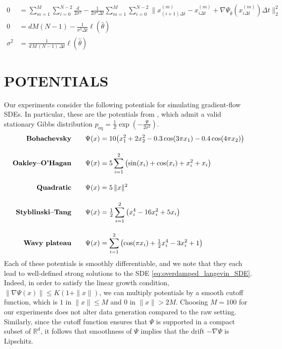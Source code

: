 \documentclass[twoside]{article}
\newcommand{\R} {\mathbb R}
\begin{document}
\begin{align*}
    0 &= \sum_{m=1}^{M}\sum_{i=0}^{N-2}\frac{d}{2\sigma^2} - \frac{1}{2\sigma^4 \Delta t}\sum_{m=1}^{M}\sum_{i=0}^{N-2}\Big\|x_{(i+1)\Delta t}^{(m)}-x_{i\Delta t}^{(m)}+\nabla \Psi_{\hat{\theta}}(x_{i\Delta t}^{(m)})\Delta t\Big\|_2^2 \\
    0 &= dM(N-1)- \frac{1}{ \sigma^2\Delta t} \ell(\hat{\theta})\\
    \sigma^2 &= \frac{1}{d\,M\,(N-1)\,\Delta t}\ell(\hat{\theta})
\end{align*}







\section{POTENTIALS}
\label{sec:potentials}

Our experiments consider the following potentials for simulating gradient-flow SDEs. In particular, these are the potentials from \citet{terpin2024learning}, which admit a valid stationary Gibbs distribution $p_{\mathrm{eq}}=\frac{1}{Z}\exp\left(-\frac{\Psi}{2\sigma^2} \right)$.
\begin{align}
\text{\textbf{Bohachevsky}} \qquad
\Psi(x) &= 10\!\left(x_1^2 + 2x_2^2 - 0.3\cos(3\pi x_1) - 0.4\cos(4\pi x_2)\right)
\label{eq:pot-bohachevsky} \\[1em]
%
\text{\textbf{Oakley--O'Hagan}} \qquad
\Psi(x) &= 5 \sum_{i=1}^2 \left(\sin(x_i) + \cos(x_i) + x_i^2 + x_i\right)
\label{eq:pot-oakley-ohagan} \\[1em]
%
\text{\textbf{Quadratic}} \qquad
\Psi(x) &= 5\,\|x\|^2
\label{eq:pot-quadratic} \\[1em]
%
\text{\textbf{Styblinski--Tang}} \qquad
\Psi(x) &= \tfrac{1}{2}\sum_{i=1}^2 \left(x_i^4 - 16x_i^2 + 5x_i\right)
\label{eq:pot-styblinski-tang} \\[1em]
%
\text{\textbf{Wavy plateau}} \qquad
\Psi(x) &= \sum_{i=1}^2 \left( \cos(\pi x_i) + \tfrac{1}{2}x_i^4 - 3x_i^2 + 1 \right)
\label{eq:pot-wavy-plateau}
\end{align}
Each of these potentials is smoothly differentiable, and we note that they each lead to well-defined strong solutions to the SDE \eqref{eq:overdamped_langevin_SDE}. Indeed, in order to satisfy the linear growth condition, $\|\nabla \Psi(x)\| \le K(1+\|x\|)$, we can multiply potentials by a smooth cutoff function, which is $1$ in $\|x\| \le M$ and $0$ in $\|x \| > 2M$. Choosing $M=100$ for our experiments does not alter data generation compared to the raw setting. Similarly, since the cutoff function ensures that $\Psi$ is supported in a compact subset of $\R^d$, it follows that smoothness of $\Psi$ implies that the drift $-\nabla \Psi$ is Lipschitz.
\end{document}
